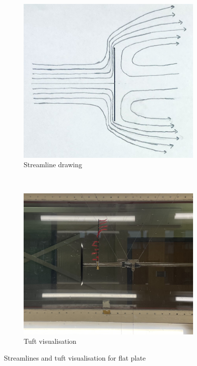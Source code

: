 \documentclass[8pt]{article}
\begin{document}
\begin{figure}[H]
    \centering
    \begin{subfigure}[t]{0.44\textwidth}
        \centering
        \includegraphics[width=1\textwidth]{Images_Videos/stream_flat_plate_3.jpg}
        \caption{Streamline drawing}
        \label{fig:figure4}
    \end{subfigure}
    ~
    \begin{subfigure}[t]{0.48\textwidth}
        \centering
        \includegraphics[width=1\textwidth]{Images_Videos/Plate_8milibar_cropped.jpg}
        \caption{Tuft visualisation}
        \label{fig:figure5}
    \end{subfigure}
    \caption{Streamlines and tuft visualisation for flat plate}
\end{figure}
\end{document}
